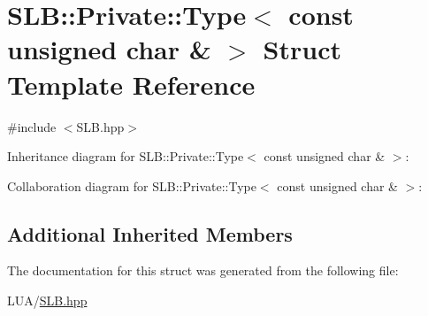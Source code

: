 \hypertarget{structSLB_1_1Private_1_1Type_3_01const_01unsigned_01char_01_6_01_4}{}\section{S\+LB\+:\+:Private\+:\+:Type$<$ const unsigned char \& $>$ Struct Template Reference}
\label{structSLB_1_1Private_1_1Type_3_01const_01unsigned_01char_01_6_01_4}


{\ttfamily \#include $<$S\+L\+B.\+hpp$>$}



Inheritance diagram for S\+LB\+:\+:Private\+:\+:Type$<$ const unsigned char \& $>$\+:


Collaboration diagram for S\+LB\+:\+:Private\+:\+:Type$<$ const unsigned char \& $>$\+:
\subsection*{Additional Inherited Members}


The documentation for this struct was generated from the following file\+:\begin{DoxyCompactItemize}
\item 
L\+U\+A/\hyperlink{SLB_8hpp}{S\+L\+B.\+hpp}\end{DoxyCompactItemize}
